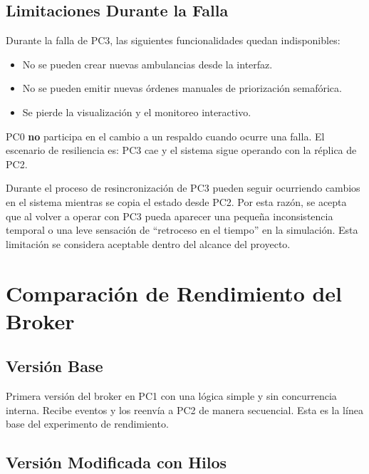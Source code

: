 \documentclass[12pt, a4paper]{article}
\begin{document}
\subsection{Limitaciones Durante la Falla}

Durante la falla de PC3, las siguientes funcionalidades quedan indisponibles:

\begin{itemize}
    \item No se pueden crear nuevas ambulancias desde la interfaz.
    \item No se pueden emitir nuevas órdenes manuales de priorización semafórica.
    \item Se pierde la visualización y el monitoreo interactivo.
\end{itemize}

PC0 \textbf{no} participa en el cambio a un respaldo cuando ocurre una falla. El escenario de resiliencia es: PC3 cae y el sistema sigue operando con la réplica de PC2.

Durante el proceso de resincronización de PC3 pueden seguir ocurriendo cambios en el sistema mientras se copia el estado desde PC2. Por esta razón, se acepta que al volver a operar con PC3 pueda aparecer una pequeña inconsistencia temporal o una leve sensación de ``retroceso en el tiempo'' en la simulación. Esta limitación se considera aceptable dentro del alcance del proyecto.

\section{Comparación de Rendimiento del Broker}

\subsection{Versión Base}

Primera versión del broker en PC1 con una lógica simple y sin concurrencia interna. Recibe eventos y los reenvía a PC2 de manera secuencial. Esta es la línea base del experimento de rendimiento.

\subsection{Versión Modificada con Hilos}
\end{document}
